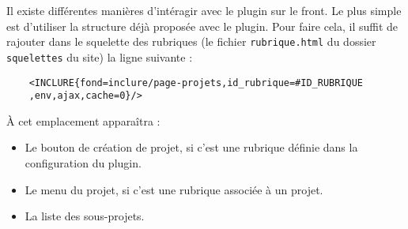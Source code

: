 Il existe différentes manières d'intéragir avec le plugin sur le front. Le plus simple est d'utiliser la structure déjà proposée avec le plugin. Pour faire cela, il suffit de rajouter dans le squelette des rubriques (le fichier \texttt{rubrique.html} du dossier \texttt{squelettes} du site) la ligne suivante : 
\begin{lstlisting}
    <INCLURE{fond=inclure/page-projets,id_rubrique=#ID_RUBRIQUE 
    ,env,ajax,cache=0}/>
\end{lstlisting}
À cet emplacement apparaîtra :
\begin{itemize}
    \item Le bouton de création de projet, si c'est une rubrique définie dans la configuration du plugin.
    \item Le menu du projet, si c'est une rubrique associée à un projet.
    \item La liste des sous-projets.
\end{itemize}